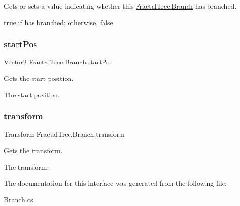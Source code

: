 Gets or sets a value indicating whether this \hyperlink{interface_fractal_tree_1_1_branch}{Fractal\+Tree.\+Branch} has branched. 

{\ttfamily true} if has branched; otherwise, {\ttfamily false}.\hypertarget{interface_fractal_tree_1_1_branch_a52b6d474fb483fb9e37e1c3fb8407ac5}{}\label{interface_fractal_tree_1_1_branch_a52b6d474fb483fb9e37e1c3fb8407ac5} 
\subsubsection{\texorpdfstring{start\+Pos}{startPos}}
{\footnotesize\ttfamily Vector2 Fractal\+Tree.\+Branch.\+start\+Pos\hspace{0.3cm}{\ttfamily [get]}}



Gets the start position. 

The start position.\hypertarget{interface_fractal_tree_1_1_branch_a4063cbfa57dfa91075a67c124ae3a3ac}{}\label{interface_fractal_tree_1_1_branch_a4063cbfa57dfa91075a67c124ae3a3ac} 
\subsubsection{\texorpdfstring{transform}{transform}}
{\footnotesize\ttfamily Transform Fractal\+Tree.\+Branch.\+transform\hspace{0.3cm}{\ttfamily [get]}}



Gets the transform. 

The transform.

The documentation for this interface was generated from the following file\+:\begin{DoxyCompactItemize}
\item 
Branch.\+cs\end{DoxyCompactItemize}
